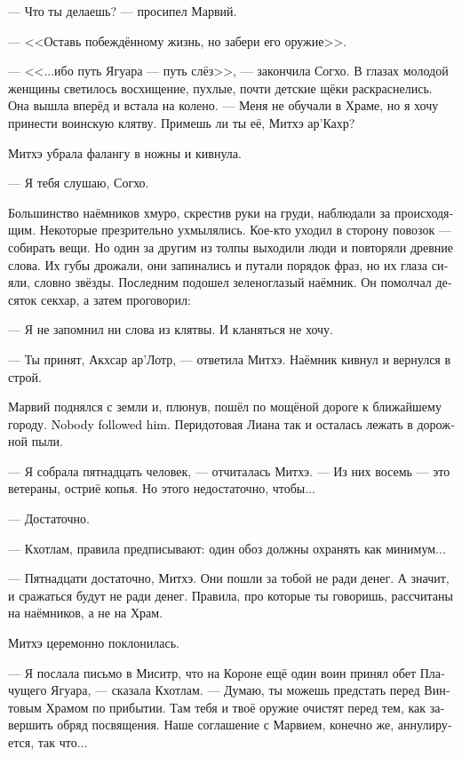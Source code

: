 \documentclass[a4paper,12pt,fleqn]{book}\usepackage{cooltooltips}\usepackage{polyglossia}\setdefaultlanguage[babelshorthands=true]{russian}\setotherlanguage{english}\defaultfontfeatures{Ligatures=TeX,Mapping=tex-text} \usepackage{xcolor}\definecolor{lightgray}{HTML}{bbbbbb}\color{lightgray}\newcommand{\ml}[3]{\textenglish{\textcolor{black}{#3}} }
\newcommand{\asterism}{\vspace{1em}{\centering\Large\bfseries$\ast~\ast~\ast$\par}\vspace{1em}}
\begin{document}
\asterism

--- Что ты делаешь? --- просипел Марвий.

--- <<Оставь побеждённому жизнь, но забери его оружие>>.

--- <<...ибо путь Ягуара --- путь слёз>>, --- закончила Согхо.
В глазах молодой женщины светилось восхищение, пухлые, почти детские щёки раскраснелись.
Она вышла вперёд и встала на колено.
--- Меня не обучали в Храме, но я хочу принести воинскую клятву.
Примешь ли ты её, Митхэ ар'Кахр?

Митхэ убрала фалангу в ножны и кивнула.

--- Я тебя слушаю, Согхо.

Большинство наёмников хмуро, скрестив руки на груди, наблюдали за происходящим.
Некоторые презрительно ухмылялись.
Кое-кто уходил в сторону повозок --- собирать вещи.
Но один за другим из толпы выходили люди и повторяли древние слова.
Их губы дрожали, они запинались и путали порядок фраз, но их глаза сияли, словно звёзды.
Последним подошел зеленоглазый наёмник.
Он помолчал десяток секхар, а затем проговорил:

--- Я не запомнил ни слова из клятвы.
И кланяться не хочу.

--- Ты принят, Акхсар ар'Лотр, --- ответила Митхэ.
Наёмник кивнул и вернулся в строй.

Марвий поднялся с земли и, плюнув, пошёл по мощёной дороге к ближайшему городу.
\ml{$0$}
{За ним не последовал никто.}
{Nobody followed him.}
Перидотовая Лиана так и осталась лежать в дорожной пыли.

\asterism

--- Я собрала пятнадцать человек, --- отчиталась Митхэ.
--- Из них восемь --- это ветераны, остриё копья.
Но этого недостаточно, чтобы...

--- Достаточно.

--- Кхотлам, правила предписывают: один обоз должны охранять как минимум...

--- Пятнадцати достаточно, Митхэ.
Они пошли за тобой не ради денег.
А значит, и сражаться будут не ради денег.
Правила, про которые ты говоришь, рассчитаны на наёмников, а не на Храм.

Митхэ церемонно поклонилась.

--- Я послала письмо в Миситр, что на Короне ещё один воин принял обет Плачущего Ягуара, --- сказала Кхотлам.
--- Думаю, ты можешь предстать перед Винтовым Храмом по прибытии.
Там тебя и твоё оружие очистят перед тем, как завершить обряд посвящения.
Наше соглашение с Марвием, конечно же, аннулируется, так что...
\end{document}
